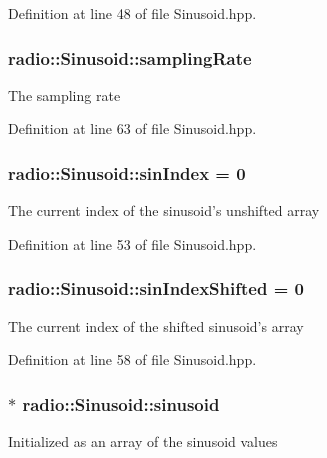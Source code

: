 Definition at line 48 of file Sinusoid.\+hpp.

\hypertarget{classradio_1_1Sinusoid_a964d64aae9acc4ea5d752534a33d76b8}{
\subsubsection[{sampling\+Rate}]{ radio\+::\+Sinusoid\+::sampling\+Rate\hspace{0.3cm}{\ttfamily [protected]}}}\label{classradio_1_1Sinusoid_a964d64aae9acc4ea5d752534a33d76b8}
The sampling rate 

Definition at line 63 of file Sinusoid.\+hpp.

\hypertarget{classradio_1_1Sinusoid_a2e7d029c5e7307967c77959367cc0224}{
\subsubsection[{sin\+Index}]{ radio\+::\+Sinusoid\+::sin\+Index = 0\hspace{0.3cm}{\ttfamily [protected]}}}\label{classradio_1_1Sinusoid_a2e7d029c5e7307967c77959367cc0224}
The current index of the sinusoid's unshifted array 

Definition at line 53 of file Sinusoid.\+hpp.

\hypertarget{classradio_1_1Sinusoid_a4acf2add824249c39046fe87f9a64f93}{
\subsubsection[{sin\+Index\+Shifted}]{ radio\+::\+Sinusoid\+::sin\+Index\+Shifted = 0\hspace{0.3cm}{\ttfamily [protected]}}}\label{classradio_1_1Sinusoid_a4acf2add824249c39046fe87f9a64f93}
The current index of the shifted sinusoid's array 

Definition at line 58 of file Sinusoid.\+hpp.

\hypertarget{classradio_1_1Sinusoid_a56556c3d3e08d1c9481c18e087ff1c85}{
\subsubsection[{sinusoid}]{$\ast$ radio\+::\+Sinusoid\+::sinusoid\hspace{0.3cm}{\ttfamily [protected]}}}\label{classradio_1_1Sinusoid_a56556c3d3e08d1c9481c18e087ff1c85}
Initialized as an array of the sinusoid values 

